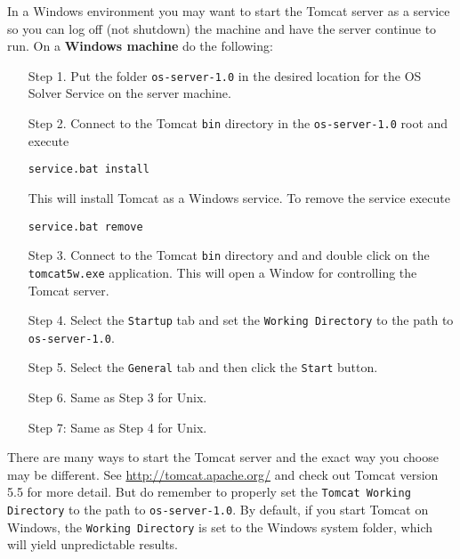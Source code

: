 \documentclass[11pt]{article}
\renewcommand{\_}{{\char"5F}}
\renewcommand{\{}{{\char"7B}}
\renewcommand{\}}{{\char"7D}}
\renewcommand{\^}{{\char"0D}}
\renewcommand{\'}{{\char"0D}}
\begin{document}
In a Windows environment you may want to start the Tomcat server as a service so you can log off (not shutdown) the machine and have the server continue to run. On a {\bf Windows machine} do the following:

\begin{itemize}

\item[Step 1.]  Put the folder  {\tt os-server-1.0}   in the desired location for the OS Solver Service on the server machine.

\item[Step 2.]  Connect to the Tomcat {\tt bin} directory in the {\tt os-server-1.0} root and execute
\begin{verbatim}
service.bat install
\end{verbatim}
This will install Tomcat as a Windows service.  To remove the service execute
\begin{verbatim}
service.bat remove
\end{verbatim}

\item[Step 3.]  Connect to the Tomcat {\tt bin} directory and and double click on the {\tt tomcat5w.exe} application.  This will open a Window for controlling the Tomcat server.

\item[Step 4.]  Select the {\tt Startup} tab and set the {\tt Working Directory} to the path to {\tt os-server-1.0}.

\item[Step 5.]  Select the {\tt General} tab and then click the {\tt Start} button.

\item[Step 6.] Same as Step 3 for Unix.

\item[Step 7:] Same as Step 4 for Unix.

\end{itemize}

\vskip 8pt

There are many ways to start the Tomcat server and the exact way you choose may be different. See \url{http://tomcat.apache.org/} and check out Tomcat version 5.5 for more detail. But do remember to properly set the {\tt Tomcat Working Directory} to the path to {\tt os-server-1.0}. By default, if you start Tomcat on Windows, the {\tt Working Directory} is set to the Windows system folder, which will yield unpredictable results.

\vskip 8pt
\end{document}
